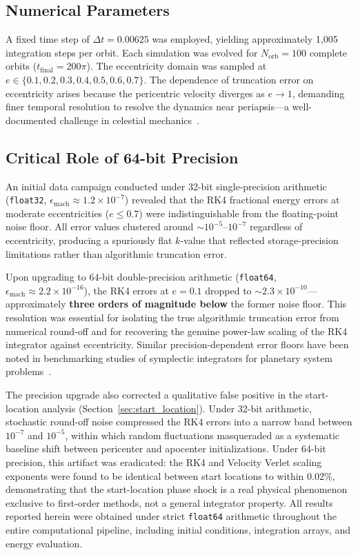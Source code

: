 \documentclass[twocolumn, 10pt]{article}
\begin{document}
\subsection{Numerical Parameters}

A fixed time step of $\Delta t = 0.00625$ was employed, yielding approximately 1{,}005 integration steps per orbit. Each simulation was evolved for $N_{\text{orb}} = 100$ complete orbits ($t_{\text{final}} = 200\pi$). The eccentricity domain was sampled at $e \in \{0.1, 0.2, 0.3, 0.4, 0.5, 0.6, 0.7\}$. The dependence of truncation error on eccentricity arises because the pericentric velocity diverges as $e \to 1$, demanding finer temporal resolution to resolve the dynamics near periapsis---a well-documented challenge in celestial mechanics~\cite{wang2020}.

\subsection{Critical Role of 64-bit Precision}

An initial data campaign conducted under 32-bit single-precision arithmetic (\texttt{float32}, $\epsilon_{\text{mach}} \approx 1.2 \times 10^{-7}$) revealed that the RK4 fractional energy errors at moderate eccentricities ($e \leq 0.7$) were indistinguishable from the floating-point noise floor. All error values clustered around $\sim 10^{-5}$--$10^{-7}$ regardless of eccentricity, producing a spuriously flat $k$-value that reflected storage-precision limitations rather than algorithmic truncation error.

Upon upgrading to 64-bit double-precision arithmetic (\texttt{float64}, $\epsilon_{\text{mach}} \approx 2.2 \times 10^{-16}$), the RK4 errors at $e = 0.1$ dropped to $\sim 2.3 \times 10^{-10}$---approximately \textbf{three orders of magnitude below} the former noise floor. This resolution was essential for isolating the true algorithmic truncation error from numerical round-off and for recovering the genuine power-law scaling of the RK4 integrator against eccentricity. Similar precision-dependent error floors have been noted in benchmarking studies of symplectic integrators for planetary system problems~\cite{hernandez2016}.

The precision upgrade also corrected a qualitative false positive in the start-location analysis (Section~\ref{sec:start_location}). Under 32-bit arithmetic, stochastic round-off noise compressed the RK4 errors into a narrow band between $10^{-7}$ and $10^{-5}$, within which random fluctuations masqueraded as a systematic baseline shift between pericenter and apocenter initializations. Under 64-bit precision, this artifact was eradicated: the RK4 and Velocity Verlet scaling exponents were found to be identical between start locations to within $0.02\%$, demonstrating that the start-location phase shock is a real physical phenomenon exclusive to first-order methods, not a general integrator property. All results reported herein were obtained under strict \texttt{float64} arithmetic throughout the entire computational pipeline, including initial conditions, integration arrays, and energy evaluation.
\end{document}
